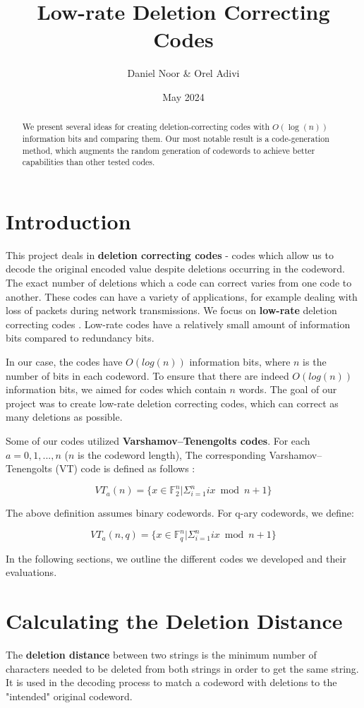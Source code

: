 \documentclass{article}
\title{Low-rate Deletion Correcting Codes}
\author{Daniel Noor & Orel Adivi}
\date{May 2024}
\begin{document}
\maketitle

\begin{abstract}
    We present several ideas for creating deletion-correcting codes with $O(\log(n))$ information bits and comparing them. Our most notable result is a code-generation method, which augments the random generation of codewords to achieve better capabilities than other tested codes.
\end{abstract}

\section{Introduction}
This project deals in \textbf{deletion correcting codes} - codes which allow us to decode the original encoded value despite deletions occurring in the codeword. The exact number of deletions which a code can correct varies from one code to another. These codes can have a variety of applications, for example dealing with loss of packets during network transmissions.
We focus on \textbf{low-rate} deletion correcting codes \cite{dcc_intro}. Low-rate codes have a relatively small amount of information bits compared to redundancy bits.

In our case, the codes have $O(log(n))$ information bits, where $n$ is the number of bits in each codeword. To ensure that there are indeed $O(log(n))$ information bits, we aimed for codes which contain $n$ words. The goal of our project was to create low-rate deletion correcting codes, which can correct as many deletions as possible.

Some of our codes utilized \textbf{Varshamov–Tenengolts codes}. For each $a = 0,1,...,n$ ($n$ is the codeword length), The corresponding Varshamov–Tenengolts (VT) code is defined as follows \cite{VT}:

\[VT_a(n) = \{x \in \mathbb{F}_2^n | \Sigma_{i=1}^n ix \bmod n+1\}\]

\noindent The above definition assumes binary codewords. For q-ary codewords, we define:

\[VT_a(n, q) = \{x \in \mathbb{F}_q^n | \Sigma_{i=1}^n ix \bmod n+1\}\]

\noindent In the following sections, we outline the different codes we developed and their evaluations.


\section{Calculating the Deletion Distance}
The \textbf{deletion distance} between two strings is the minimum number of characters needed to be deleted from both strings in order to get the same string. It is used in the decoding process to match a codeword with deletions to the "intended" original codeword.
\end{document}
